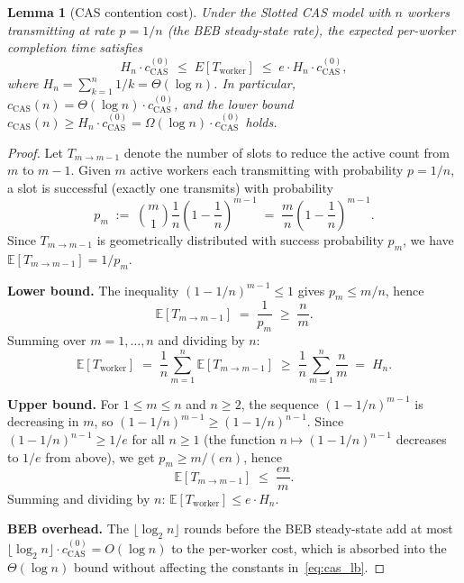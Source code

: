 \documentclass[11pt,a4paper]{article}
\newtheorem{lemma}[theorem]{Lemma}
\begin{document}
\begin{lemma}[CAS contention cost]\label{lem:cas_contention}
Under the Slotted CAS model with $n$ workers transmitting at rate
$p = 1/n$ (the BEB steady-state rate), the expected per-worker
completion time satisfies
\begin{equation}\label{eq:cas_lb}
  H_n \cdot c_{\mathrm{CAS}}^{(0)}
  \;\leq\;
  E[T_{\mathrm{worker}}]
  \;\leq\;
  e \cdot H_n \cdot c_{\mathrm{CAS}}^{(0)},
\end{equation}
where $H_n = \sum_{k=1}^n 1/k = \Theta(\log n)$.
In particular, $c_{\mathrm{CAS}}(n) = \Theta(\log n)\cdot c_{\mathrm{CAS}}^{(0)}$,
and the \emph{lower bound} $c_{\mathrm{CAS}}(n) \geq H_n\cdot c_{\mathrm{CAS}}^{(0)}
= \Omega(\log n)\cdot c_{\mathrm{CAS}}^{(0)}$ holds.
\end{lemma}

\begin{proof}
Let $T_{m\to m-1}$ denote the number of slots to reduce the active
count from $m$ to $m-1$.  Given $m$ active workers each transmitting
with probability $p = 1/n$, a slot is successful (exactly one transmits)
with probability
\[
  p_m
  \;:=\;
  \binom{m}{1}\frac{1}{n}\!\left(1-\frac{1}{n}\right)^{\!m-1}
  \;=\;
  \frac{m}{n}\!\left(1-\frac{1}{n}\right)^{\!m-1}.
\]
Since $T_{m\to m-1}$ is geometrically distributed with success
probability $p_m$, we have $\mathbb{E}[T_{m\to m-1}] = 1/p_m$.

\noindent\textbf{Lower bound.}
The inequality $(1-1/n)^{m-1} \leq 1$ gives $p_m \leq m/n$, hence
\[
  \mathbb{E}[T_{m\to m-1}]
  \;=\; \frac{1}{p_m}
  \;\geq\; \frac{n}{m}.
\]
Summing over $m = 1,\ldots,n$ and dividing by $n$:
\[
  \mathbb{E}[T_{\mathrm{worker}}]
  \;=\;
  \frac{1}{n}\sum_{m=1}^{n}\mathbb{E}[T_{m\to m-1}]
  \;\geq\;
  \frac{1}{n}\sum_{m=1}^{n}\frac{n}{m}
  \;=\;
  H_n.
\]

\noindent\textbf{Upper bound.}
For $1 \leq m \leq n$ and $n \geq 2$, the sequence $(1-1/n)^{m-1}$
is decreasing in $m$, so
$(1-1/n)^{m-1} \geq (1-1/n)^{n-1}$.
Since $(1-1/n)^{n-1} \geq 1/e$ for all $n \geq 1$
(the function $n\mapsto (1-1/n)^{n-1}$ decreases to $1/e$ from above),
we get $p_m \geq m/(en)$, hence
\[
  \mathbb{E}[T_{m\to m-1}]
  \;\leq\;
  \frac{en}{m}.
\]
Summing and dividing by $n$: $\mathbb{E}[T_{\mathrm{worker}}] \leq e\cdot H_n$.

\noindent\textbf{BEB overhead.}
The $\lfloor\log_2 n\rfloor$ rounds before the BEB steady-state add at
most $\lfloor\log_2 n\rfloor \cdot c_{\mathrm{CAS}}^{(0)} = O(\log n)$
to the per-worker cost, which is absorbed into the $\Theta(\log n)$
bound without affecting the constants in~\eqref{eq:cas_lb}.
\end{proof}
\end{document}

